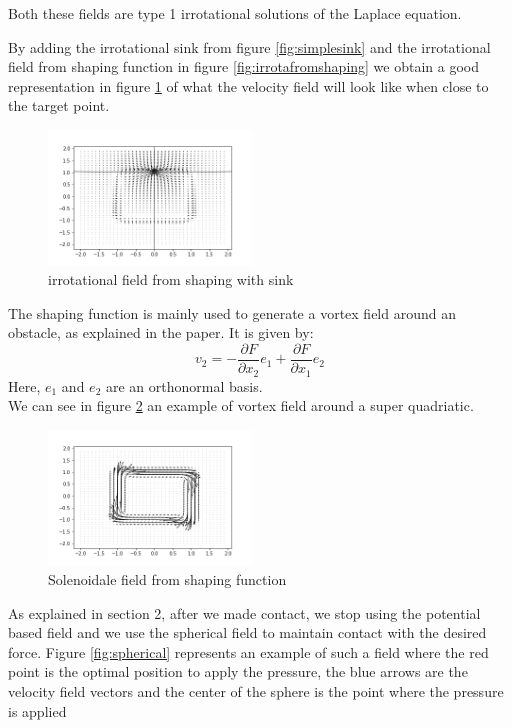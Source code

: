 Both these fields are type 1 irrotational solutions of the Laplace equation.

By adding the irrotational sink from figure \ref{fig:simplesink} and the irrotational field from shaping function in figure \ref{fig:irrotafromshaping} we obtain a good representation in figure \ref{fig:irrotafromshapingwithsink} of what the velocity field will look like when close to the target point. 
\begin{figure}[h!]
    \centering
    \includegraphics[width=0.48\textwidth]{Images/irrotashapingwithsink.png}
    \caption{irrotational field from shaping with sink}
    \label{fig:irrotafromshapingwithsink}
\end{figure}

The shaping function is mainly used to generate a vortex field around an obstacle, as explained in the paper. It is given by: 
\begin{equation}
    v_2=-\frac{\partial{F}}{\partial{x_2}}e_1 + \frac{\partial{F}}{\partial{x_1}}e_2
\end{equation}
Here, $e_1$ and $e_2$ are an orthonormal basis. \\ 
We can see in figure \ref{fig:rotafromshaping} an example of vortex field around a super quadriatic.
\begin{figure}[h!]
    \centering
    \includegraphics[width=0.48\textwidth]{Images/rotafromshaping.png}
    \caption{Solenoidale field from shaping function}
    \label{fig:rotafromshaping}
\end{figure}

As explained in section 2, after we made contact, we stop using the potential based field and we use the spherical field to maintain 
contact with the desired force.
Figure \ref{fig:spherical} represents an example of such a field where the red point is the optimal position to apply the pressure, the blue arrows are the velocity field vectors and the center of the sphere is the point where the pressure is applied

